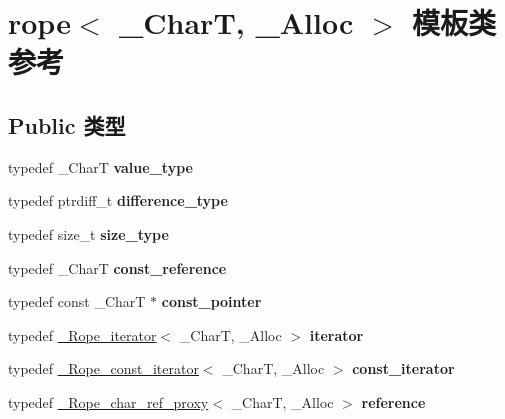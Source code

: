 \hypertarget{classrope}{}\section{rope$<$ \+\_\+\+CharT, \+\_\+\+Alloc $>$ 模板类 参考}
\label{classrope}
\subsection*{Public 类型}
\begin{DoxyCompactItemize}
\item 
\mbox{\label{classrope_a45ffe81bcc165a72f51b5ccbbc62e689}} 
typedef \+\_\+\+CharT {\bfseries value\+\_\+type}
\item 
\mbox{\label{classrope_a03ad6aa37a82b4fb9a33be00c9160c1b}} 
typedef ptrdiff\+\_\+t {\bfseries difference\+\_\+type}
\item 
\mbox{\label{classrope_adb17dff084404650e7b5cf6bd9499938}} 
typedef size\+\_\+t {\bfseries size\+\_\+type}
\item 
\mbox{\label{classrope_ae9aca093f5340d6eb1511fd98620cde3}} 
typedef \+\_\+\+CharT {\bfseries const\+\_\+reference}
\item 
\mbox{\label{classrope_ad14a41c86406c2e4df6a709aeaf9b01e}} 
typedef const \+\_\+\+CharT $\ast$ {\bfseries const\+\_\+pointer}
\item 
\mbox{\label{classrope_afecace615862f262d691f4317c7682c3}} 
typedef \hyperlink{class___rope__iterator}{\+\_\+\+Rope\+\_\+iterator}$<$ \+\_\+\+CharT, \+\_\+\+Alloc $>$ {\bfseries iterator}
\item 
\mbox{\label{classrope_a6b4867f7a989742637fe60b02cbddb4e}} 
typedef \hyperlink{class___rope__const__iterator}{\+\_\+\+Rope\+\_\+const\+\_\+iterator}$<$ \+\_\+\+CharT, \+\_\+\+Alloc $>$ {\bfseries const\+\_\+iterator}
\item 
\mbox{\label{classrope_a29b34908687e2416224dc0ae7dcc5f2b}} 
typedef \hyperlink{class___rope__char__ref__proxy}{\+\_\+\+Rope\+\_\+char\+\_\+ref\+\_\+proxy}$<$ \+\_\+\+CharT, \+\_\+\+Alloc $>$ {\bfseries reference}

\end{DoxyCompactItemize}
